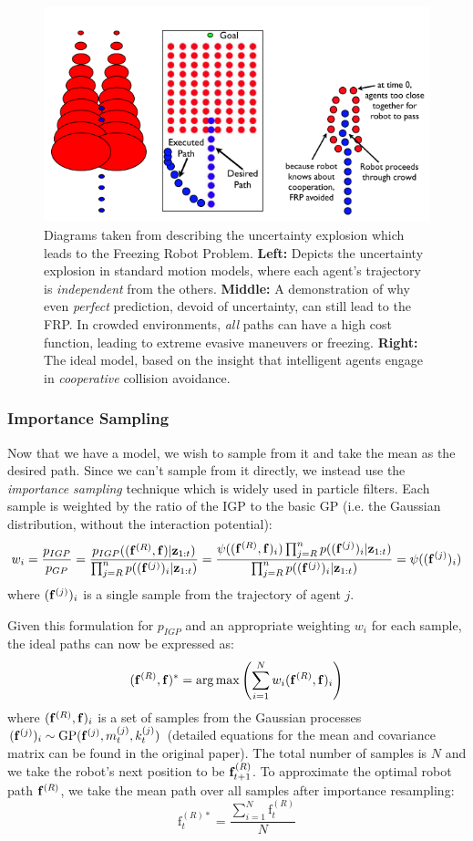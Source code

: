 \documentclass[a4paper,11pt,headings=small]{article}
\DeclareMathOperator*{\argmax}{arg\,max}
\begin{document}
\begin{figure}[h]
\centering
\includegraphics[width=.75\textwidth]{uncertainty-explosion.png}
\caption{Diagrams taken from \cite{Trautman2010} describing the uncertainty explosion which leads to the Freezing Robot Problem. \textbf{Left:} Depicts the uncertainty explosion in standard motion models, where each agent's trajectory is \emph{independent} from the others. \textbf{Middle:} A demonstration of why even \emph{perfect} prediction, devoid of uncertainty, can still lead to the FRP. In crowded environments, \emph{all} paths can have a high cost function, leading to extreme evasive maneuvers or freezing. \textbf{Right:} The ideal model, based on the insight that intelligent agents engage in \emph{cooperative} collision avoidance.}
\label{uncertainty}
\end{figure}

\subsubsection*{Importance Sampling}
\quad Now that we have a model, we wish to sample from it and take the mean as the desired path. Since we can't sample from it directly, we instead use the \emph{importance sampling} technique which is widely used in particle filters. Each sample is weighted by the ratio of the IGP to the basic GP (i.e. the Gaussian distribution, without the interaction potential):
$$ w_i = \frac{p_{IGP}}{p_{GP}} = \frac{p_{IGP}((\mathbf{f}^{(R)},\mathbf{f}) | \mathbf{z}_{1:t})}{\prod_{j=R}^n p((\mathbf{f}^{(j)})_i | \mathbf{z}_{1:t})} = \frac{\psi((\mathbf{f}^{(R)},\mathbf{f})_i) \prod_{j=R}^n p((\mathbf{f}^{(j)})_i | \mathbf{z}_{1:t})}{\prod_{j=R}^n p((\mathbf{f}^{(j)})_i | \mathbf{z}_{1:t})} = \psi((\mathbf{f}^{(j)})_i)$$
where $(\mathbf{f}^{(j)})_i$ is a single sample from the trajectory of agent $j$.

Given this formulation for $p_{IGP}$ and an appropriate weighting $w_i$ for each sample, the ideal paths can now be expressed as:
$$ (\fr,\f)^* = \argmax\left( \sum_{i=1}^N w_i(\fr,\f)_i \right) $$
where $(\mathbf{f}^{(R)},\mathbf{f})_i$ is a set of samples from the Gaussian processes $(\mathbf{f}^{(j)})_i \sim \textrm{GP}(\mathbf{f}^{(j)}, m_t^{(j)}, k_t^{(j)})$ (detailed equations for the mean and covariance matrix can be found in the original paper). The total number of samples is $N$ and we take the robot's next position to be $\mathbf{f}^{(R)}_{t+1}$. To approximate the optimal robot path $\mathbf{f}^{(R)}$, we take the mean path over all samples after importance resampling:
$$ \mathrm{f}^{(R)*}_t = \frac{\sum_{i=1}^N \mathrm{f}^{(R)}_t}{N} $$
\end{document}
